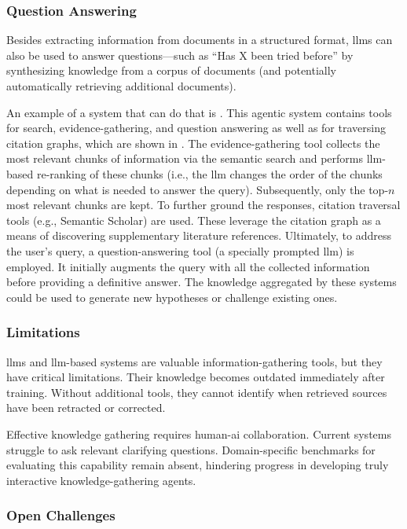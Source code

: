 \subsubsection{Question Answering}
Besides extracting information from documents in a structured format, \glspl{llm} can also be used to answer questions---such as \enquote{Has X been tried before} by synthesizing knowledge from a corpus of documents (and potentially automatically retrieving additional documents). 

An example of a system that can do that is . This agentic system contains tools for search, evidence-gathering, and question answering as well as for traversing citation graphs, which are shown in . The evidence-gathering tool collects the most relevant chunks of information via the semantic search and performs \gls{llm}-based re-ranking of these chunks (i.e., the \gls{llm} changes the order of the chunks depending on what is needed to answer the query).
Subsequently, only the top-$n$ most relevant chunks are kept. To further ground the responses, citation traversal tools (e.g., Semantic Scholar\autocite{kinney2023semantic}) are used. 
These leverage the citation graph as a means of discovering supplementary literature references. Ultimately, to address the user's query, a question-answering tool (a specially prompted \gls{llm}) is employed. It initially augments the query with all the collected information before providing a definitive answer.
The knowledge aggregated by these systems could be used to generate new hypotheses or challenge existing ones. 

\subsubsection{Limitations} 

\Glspl{llm} and \gls{llm}-based systems are valuable information-gathering tools, but they have critical limitations. Their knowledge becomes outdated immediately after training. Without additional tools, they cannot identify when retrieved sources have been retracted or corrected. 

Effective knowledge gathering requires human-\gls{ai} collaboration. Current systems struggle to ask relevant clarifying questions.\autocite{choudhury2025bed0llm0} Domain-specific benchmarks for evaluating this capability remain absent, hindering progress in developing truly interactive knowledge-gathering agents.

\subsubsection{Open Challenges}

